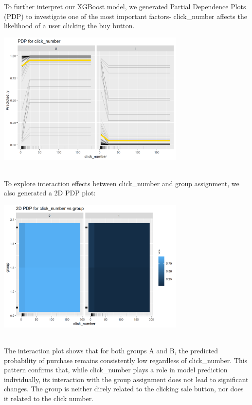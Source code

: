 \documentclass[
  letterpaper,
  DIV=11,
  numbers=noendperiod]{scrartcl}
\begin{document}
To further interpret our XGBoost model, we generated Partial Dependence
Plots (PDP) to investigate one of the most important factors-
click\_number affects the likelihood of a user clicking the buy
button.\\
\begin{center}
\includegraphics[width=0.7\textwidth,height=\textheight]{data_ana_pj3_files/figure-html/unnamed-chunk-9-1.png}
\end{center}
\\
To explore interaction effects between click\_number and group
assignment, we also generated a 2D PDP plot: \begin{center}
\includegraphics[width=0.7\textwidth,height=\textheight]{data_ana_pj3_files/figure-html/unnamed-chunk-9-2.png}
\end{center}
\\
The interaction plot shows that for both groups A and B, the predicted
probability of purchase remains consistently low regardless of
click\_number. This pattern confirms that, while click\_number plays a
role in model prediction individually, its interaction with the group
assignment does not lead to significant changes. The group is neither
direly related to the clicking sale button, nor does it related to the
click number.\\
\end{document}

